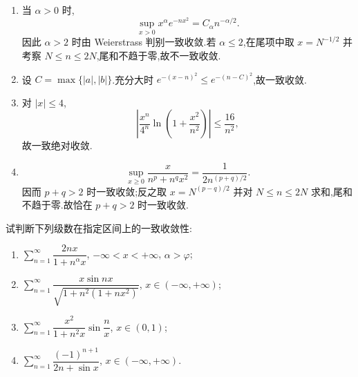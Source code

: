 \begin{solution}
    \leavevmode
    \begin{enumerate}
        \item 当 $\alpha>0$ 时,
              \[
                  \sup_{x>0}x^\alpha e^{-nx^2}=C_\alpha n^{-\alpha/2}.
              \]
              因此 $\alpha>2$ 时由 Weierstrass 判别一致收敛.若 $\alpha\leq2$,在尾项中取 $x=N^{-1/2}$ 并考察 $N\leq n\leq2N$,尾和不趋于零,故不一致收敛.
        \item 设 $C=\max\{|a|,|b|\}$.充分大时
              $e^{-(x-n)^2}\leq e^{-(n-C)^2}$,故一致收敛.
        \item 对 $|x|\leq4$,
              \[
                  \left|\dfrac{x^n}{4^n}\ln\left(1+\dfrac{x^2}{n^2}\right)\right|
                  \leq\dfrac{16}{n^2},
              \]
              故一致绝对收敛.
        \item
              \[
                  \sup_{x\geq0}\dfrac{x}{n^p+n^qx^2}=\dfrac{1}{2n^{(p+q)/2}}.
              \]
              因而 $p+q>2$ 时一致收敛;反之取 $x=N^{(p-q)/2}$ 并对
              $N\leq n\leq2N$ 求和,尾和不趋于零.故恰在 $p+q>2$ 时一致收敛.
    \end{enumerate}
\end{solution}

\begin{example}
    试判断下列级数在指定区间上的一致收敛性:
    \begin{enumerate}
        \item $\displaystyle\sum\limits_{n=1}^{\infty}\dfrac{2nx}{1+n^\alpha x}$, $-\infty<x<+\infty$, $\alpha>\varphi$;
        \item $\displaystyle\sum\limits_{n=1}^{\infty}\dfrac{x\sin nx}{\sqrt{1+n^2(1+nx^2)}}$, $x\in(-\infty,+\infty)$;
        \item $\displaystyle\sum\limits_{n=1}^{\infty}\dfrac{x^2}{1+n^2x}\sin\dfrac{n}{x}$, $x\in(0,1)$;
        \item $\displaystyle\sum\limits_{n=1}^{\infty}\dfrac{(-1)^{n+1}}{2n+\sin x}$, $x\in(-\infty,+\infty)$.
    \end{enumerate}
\end{example}
\exampleblank

